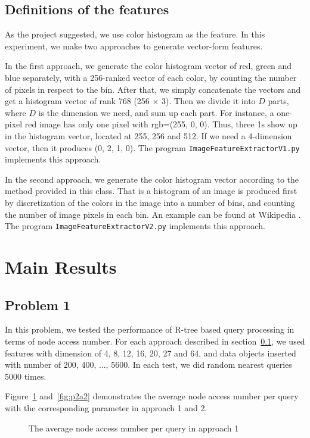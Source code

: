 \documentclass{acm_proc_article-sp}
\begin{document}
\subsection{Definitions of the features}
\label{feature definition}
As the project suggested, we use color histogram as the feature. In this experiment, we make two approaches to generate vector-form features.

In the first approach, we generate the color histogram vector of red, green and blue separately, with a 256-ranked vector of each color, by counting the number of pixels in respect to the bin. After that, we simply concatenate the vectors and get a histogram vector of rank 768 (256 $\times$ 3). Then we divide it into $D$ parts, where $D$ is the dimension we need, and sum up each part. For instance, a one-pixel red image has only one pixel with rgb=(255, 0, 0). Thus, three 1s show up in the histogram vector, located at 255, 256 and 512. If we need a 4-dimension vector, then it produces (0, 2, 1, 0). The program \texttt{ImageFeatureExtractorV1.py} implements this approach.

In the second approach, we generate the color histogram vector according to the method provided in this class. That is a histogram of an image is produced first by discretization of the colors in the image into a number of bins, and counting the number of image pixels in each bin. An example can be found at Wikipedia \cite{website:wikihist}. The program \texttt{ImageFeatureExtractorV2.py} implements this approach.

\section{Main Results}
\subsection{Problem 1}
In this problem, we tested the performance of R-tree based query processing in terms of node access number. For each approach described in section~\ref{feature definition}, we used features with dimension of 4, 8, 12, 16, 20, 27 and 64, and data objects inserted with number of 200, 400, ..., 5600. In each test, we did random nearest queries 5000 times.

Figure~\ref{fig:p2a1} and~\ref{fig:p2a2} demonstrates the average node access number per query with the corresponding parameter in approach 1 and 2.

\begin{figure}
\centering
{}
\caption{The average node access number per query in approach 1}
\label{fig:p2a1}
\end{figure}
\end{document}
